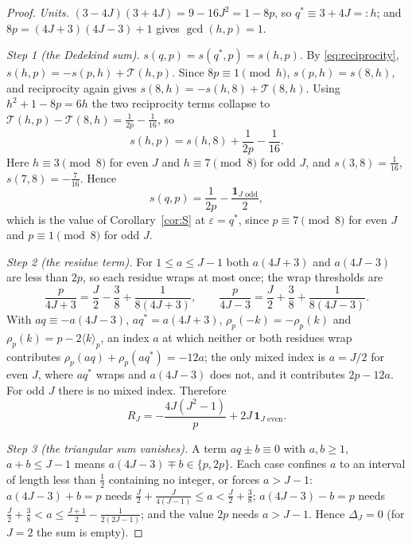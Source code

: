 \documentclass[11pt]{article}
\theoremstyle{definition}
\newcommand{\ind}{\mathbf 1}
\begin{document}
\begin{proof}
\emph{Units.}  $(3-4J)(3+4J)=9-16J^2=1-8p$, so $q^*\equiv3+4J=:h$; and
$8p=(4J+3)(4J-3)+1$ gives $\gcd(h,p)=1$.

\emph{Step 1 (the Dedekind sum).}  $s(q,p)=s(q^*,p)=s(h,p)$.  By
\eqref{eq:reciprocity}, $s(h,p)=-s(p,h)+\mathcal T(h,p)$.  Since
$8p\equiv1\pmod h$, $s(p,h)=s(8,h)$, and reciprocity again gives
$s(8,h)=-s(h,8)+\mathcal T(8,h)$.  Using $h^2+1-8p=6h$ the two
reciprocity terms collapse to $\mathcal T(h,p)-\mathcal T(8,h)=\frac1{2p}-\frac1{16}$,
so
\[
 s(h,p)=s(h,8)+\frac1{2p}-\frac1{16}.
\]
Here $h\equiv3\pmod8$ for even $J$ and $h\equiv7\pmod8$ for odd $J$, and
$s(3,8)=\frac1{16}$, $s(7,8)=-\frac7{16}$.  Hence
\begin{equation}
 s(q,p)=\frac1{2p}-\frac{\ind_{J\text{ odd}}}2 ,
 \label{eq:C4-dedekind}
\end{equation}
which is the value of Corollary~\ref{cor:S} at $\varepsilon=q^*$, since
$p\equiv7\pmod8$ for even $J$ and $p\equiv1\pmod8$ for odd $J$.

\emph{Step 2 (the residue term).}  For $1\leq a\leq J-1$ both $a(4J+3)$
and $a(4J-3)$ are less than $2p$, so each residue wraps at most once; the
wrap thresholds are
\[
 \frac p{4J+3}=\frac J2-\frac38+\frac1{8(4J+3)},\qquad
 \frac p{4J-3}=\frac J2+\frac38+\frac1{8(4J-3)} .
\]
With $aq\equiv-a(4J-3)$, $aq^*=a(4J+3)$, $\rho_p(-k)=-\rho_p(k)$ and
$\rho_p(k)=p-2\langle k\rangle_p$, an index $a$ at which neither or both
residues wrap contributes $\rho_p(aq)+\rho_p(aq^*)=-12a$; the only mixed
index is $a=J/2$ for even $J$, where $aq^*$ wraps and $a(4J-3)$ does
not, and it contributes $2p-12a$.  For odd $J$ there is no mixed index.
Therefore
\begin{equation}
 R_J=-\frac{4J(J^2-1)}p+2J\,\ind_{J\text{ even}} .
 \label{eq:C4-residue}
\end{equation}

\emph{Step 3 (the triangular sum vanishes).}  A term $aq\pm b\equiv0$
with $a,b\geq1$, $a+b\leq J-1$ means $a(4J-3)\mp b\in\{p,2p\}$.  Each
case confines $a$ to an interval of length less than $\frac12$ containing
no integer, or forces $a>J-1$: $a(4J-3)+b=p$ needs
$\frac J2+\frac J{4(J-1)}\leq a<\frac J2+\frac38$; $a(4J-3)-b=p$ needs
$\frac J2+\frac38<a\leq\frac{J+1}2-\frac1{2(2J-1)}$; and the value $2p$
needs $a>J-1$.  Hence $\Delta_J=0$ (for $J=2$ the sum is empty).


\end{proof}
\end{document}
